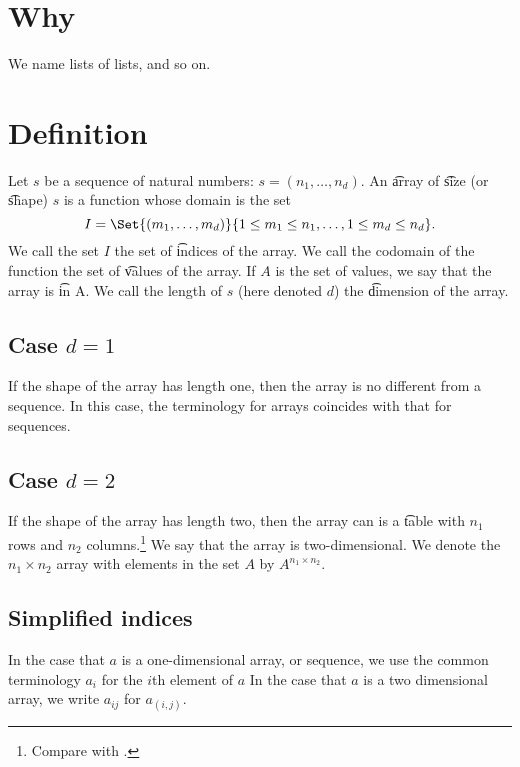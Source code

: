 
\section*{Why}

We name lists of lists, and so on.

\section*{Definition}

Let $s$ be a sequence of natural numbers: $s = (n_1, \dots , n_d)$.
An \t{array} of \t{size} (or \t{shape}) $s$ is a function whose domain is the set
\[
I = \Set{(m_1, \dots , m_d)}{ 1 \leq m_1 \leq n_1, \dots , 1 \leq m_d \leq n_d}.
\]
We call the set $I$ the set of \t{indices} of the array.
We call the codomain of the function the set of \t{values} of the array.
If $A$ is the set of values, we say that the array is \t{in} A.
We call the length of $s$ (here denoted $d$) the \t{dimension} of the array.

\subsection*{Case $d = 1$}

If the shape of the array has length one, then the array is no different from a sequence.
In this case, the terminology for arrays coincides with that for sequences.

\subsection*{Case $d = 2$}

If the shape of the array has length two, then the array can is a \t{table} with $n_1$ rows and $n_2$ columns.\footnote{Compare with .}
We say that the array is two-dimensional.
We denote the $n_1 \times  n_2$ array with elements in the set $A$ by $A^{n_1 \times  n_2}$.

\subsection*{Simplified indices}

In the case that $a$ is a one-dimensional array, or sequence, we use the common terminology $a_i$ for the $i$th element of $a$
In the case that $a$ is a two dimensional array, we write $a_{ij}$ for $a_{(i,j)}$.
